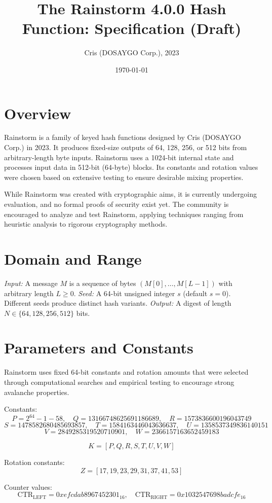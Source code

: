 \documentclass[11pt,a4paper]{article}
\title{The Rainstorm 4.0.0 Hash Function: Specification (Draft)}
\author{Cris (DOSAYGO Corp.), 2023}
\date{\today}
\begin{document}
\maketitle

\section*{Overview}
Rainstorm is a family of keyed hash functions designed by Cris (DOSAYGO Corp.) in 2023. It produces fixed-size outputs of 64, 128, 256, or 512 bits from arbitrary-length byte inputs. Rainstorm uses a 1024-bit internal state and processes input data in 512-bit (64-byte) blocks. Its constants and rotation values were chosen based on extensive testing to ensure desirable mixing properties.

While Rainstorm was created with cryptographic aims, it is currently undergoing evaluation, and no formal proofs of security exist yet. The community is encouraged to analyze and test Rainstorm, applying techniques ranging from heuristic analysis to rigorous cryptography methods.

\section*{Domain and Range}
\textit{Input:} A message $M$ is a sequence of bytes $(M[0], \ldots, M[L-1])$ with arbitrary length $L \ge 0$.  
\textit{Seed:} A 64-bit unsigned integer $s$ (default $s=0$). Different seeds produce distinct hash variants.  
\textit{Output:} A digest of length $N \in \{64, 128, 256, 512\}$ bits.

\section*{Parameters and Constants}
Rainstorm uses fixed 64-bit constants and rotation amounts that were selected through computational searches and empirical testing to encourage strong avalanche properties.

Constants:
\[
P = 2^{64}-1 - 58, \quad Q = 13166748625691186689, \quad R = 1573836600196043749
\]
\[
S = 1478582680485693857, \quad T = 1584163446043636637, \quad U = 1358537349836140151
\]
\[
V = 2849285319520710901, \quad W = 2366157163652459183
\]

\[
K = [P, Q, R, S, T, U, V, W]
\]

Rotation constants:
\[
Z = [17, 19, 23, 29, 31, 37, 41, 53]
\]

Counter values:
\[
\text{CTR}_{\text{LEFT}} = 0xefcdab8967452301_{16}, \quad
\text{CTR}_{\text{RIGHT}} = 0x1032547698badcfe_{16}
\]
\end{document}

